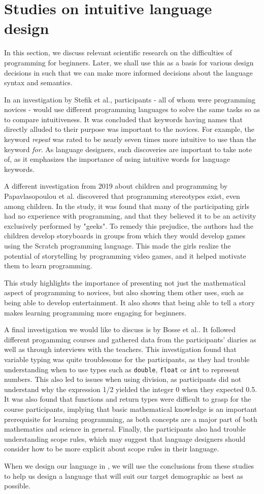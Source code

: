 \section{Studies on intuitive language design} \label{sec:scientific_research}
In this section, we discuss relevant scientific research on the difficulties of programming for beginners.
Later, we shall use this as a basis for various design decisions in \dazel{} such that we can make more
informed decisions about the language syntax and semantics.

In an investigation by Stefik et al.\cite{stefik_empirical_2011}, participants - all of whom were
programming novices - would use different programming languages to solve the same tasks so as to compare intuitiveness.
It was concluded that keywords having names that directly alluded to their purpose was important to the novices.
For example, the keyword \emph{repeat} was rated to be nearly seven times more intuitive to use than the keyword \emph{for}.
As language designers, such discoveries are important to take note of, as it emphasizes the importance of using intuitive words for language keywords.

A different investigation from 2019 about children and programming by Papavlasopoulou et al.\cite{papavlasopoulou_exploring_2019} discovered that
programming stereotypes exist, even among children.
In the study, it was found that many of the participating girls had no experience with programming, and that they believed it
to be an activity exclusively performed by "geeks".
To remedy this prejudice, the authors had the children develop storyboards in groups from which they would develop games using the
Scratch programming language.
This made the girls realize the potential of storytelling by programming video games, and it helped motivate them to learn programming.

This study highlights the importance of presenting not just the mathematical aspect of programming to novices, but also
showing them other uses, such as being able to develop entertainment.
It also shows that being able to tell a story makes learning programming more engaging for beginners.


A final investigation we would like to discuss is by Bosse et al.\cite{bosseWhyProgrammingDifficult2017}.
It followed different progamming courses and gathered data from the participants' diaries as well as through interviews with the teachers.
This investigation found that variable typing was quite troublesome for the participants, as they had trouble understanding when to use
types such as \texttt{double}, \texttt{float} or \texttt{int} to represent numbers. This also led to issues when using division, as participants
did not understand why the expression 1/2 yielded the integer 0 when they expected 0.5.
It was also found that functions and return types were difficult to grasp for the course participants, implying that basic mathematical
knowledge is an important prerequisite for learning programming, as both concepts are a major part of both mathematics and science in general.
Finally, the participants also had trouble understanding scope rules, which may suggest that language designers should consider how to be more explicit about scope rules in their language.


When we design our language in , we will use the conclusions from these studies to help us design a language that will suit our target demographic
as best as possible.

